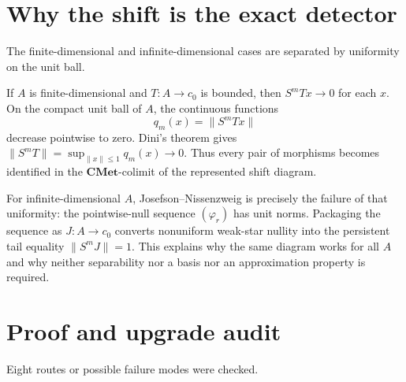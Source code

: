 \documentclass[11pt]{article}
\newcommand{\CMet}{\mathbf{CMet}}
\begin{document}
\section{Why the shift is the exact detector}

The finite-dimensional and infinite-dimensional cases are separated by
uniformity on the unit ball.

If $A$ is finite-dimensional and $T:A\to c_0$ is bounded, then
$S^mTx\to0$ for each $x$.  On the compact unit ball of $A$, the continuous
functions
\[
 q_m(x)=\|S^mTx\|
\]
decrease pointwise to zero.  Dini's theorem gives
$\|S^mT\|=\sup_{\|x\|\leq1}q_m(x)\to0$.  Thus every pair of morphisms becomes
identified in the $\CMet$-colimit of the represented shift diagram.

For infinite-dimensional $A$, Josefson--Nissenzweig is precisely the failure
of that uniformity: the pointwise-null sequence $(\varphi_r)$ has unit norms.
Packaging the sequence as $J:A\to c_0$ converts nonuniform weak-star nullity
into the persistent tail equality $\|S^mJ\|=1$.  This explains why the same
diagram works for all $A$ and why neither separability nor a basis nor an
approximation property is required.

\section{Proof and upgrade audit}

Eight routes or possible failure modes were checked.
\end{document}
